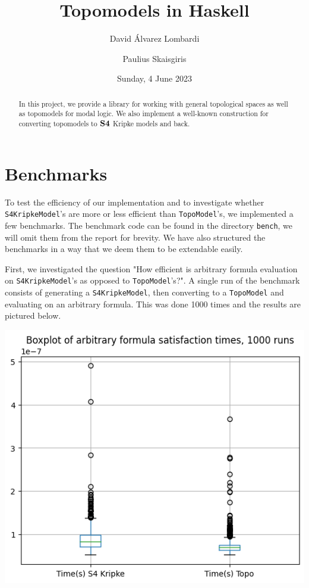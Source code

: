\documentclass[12pt,a4paper]{article}
\title{Topomodels in Haskell}
\author{David Álvarez Lombardi \and Paulius Skaisgiris}
\date{Sunday, 4 June 2023}
\begin{document}
\maketitle

\begin{abstract}
In this project, we provide a library for working with general topological spaces as well as topomodels for modal logic.
We also implement a well-known construction for converting topomodels to $\mathbf{S4}$ Kripke models and back.
\end{abstract}

\tableofcontents

\clearpage






















\section{Benchmarks}

To test the efficiency of our implementation and to investigate whether \verb|S4KripkeModel|'s
are more or less efficient than \verb|TopoModel|'s, we implemented a few benchmarks. The benchmark code
can be found in the directory \verb|bench|, we will omit them from the report for brevity. We have also
structured the benchmarks in a way that we deem them to be extendable easily.

First, we investigated the question "How efficient is arbitrary formula evaluation on \verb|S4KripkeModel|'s
as opposed to \verb|TopoModel|'s?". A single run of the benchmark consists of generating a \verb|S4KripkeModel|,
then converting to a \verb|TopoModel| and evaluating on an arbitrary formula. This was done 1000 times and the
results are pictured below.

\begin{center}
\includegraphics*[width=0.5\linewidth]{bench-formula-satisfaction.png}
\end{center}
\end{document}
